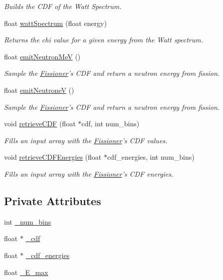 \begin{DoxyCompactItemize}
\begin{DoxyCompactList}\small\item\em Builds the C\-D\-F of the Watt Spectrum. \end{DoxyCompactList}\item 
float \hyperlink{classFissioner_a0d7eec9e2367c433a3dff894b86066af}{watt\-Spectrum} (float energy)
\begin{DoxyCompactList}\small\item\em Returns the chi value for a given energy from the Watt spectrum. \end{DoxyCompactList}\item 
float \hyperlink{classFissioner_a7d4ead1d590eecfc19e7a57361f1c4d7}{emit\-Neutron\-Me\-V} ()
\begin{DoxyCompactList}\small\item\em Sample the \hyperlink{classFissioner}{Fissioner}'s C\-D\-F and return a neutron energy from fission. \end{DoxyCompactList}\item 
float \hyperlink{classFissioner_ab60b9ea50cf7d8b1b1a2b7e5a134ee55}{emit\-Neutrone\-V} ()
\begin{DoxyCompactList}\small\item\em Sample the \hyperlink{classFissioner}{Fissioner}'s C\-D\-F and return a neutron energy from fission. \end{DoxyCompactList}\item 
void \hyperlink{classFissioner_a6df11ab0fc579364199a88e72d60f666}{retrieve\-C\-D\-F} (float $\ast$cdf, int num\-\_\-bins)
\begin{DoxyCompactList}\small\item\em Fills an input array with the \hyperlink{classFissioner}{Fissioner}'s C\-D\-F values. \end{DoxyCompactList}\item 
void \hyperlink{classFissioner_a62bbe8c05eea905ec6aef328bbab8da8}{retrieve\-C\-D\-F\-Energies} (float $\ast$cdf\-\_\-energies, int num\-\_\-bins)
\begin{DoxyCompactList}\small\item\em Fills an input array with the \hyperlink{classFissioner}{Fissioner}'s C\-D\-F energies. \end{DoxyCompactList}\end{DoxyCompactItemize}
\subsection*{Private Attributes}
\begin{DoxyCompactItemize}
\item 
int \hyperlink{classFissioner_a541a4b34ec2fc989a376df0cc5f6e905}{\-\_\-num\-\_\-bins}
\item 
float $\ast$ \hyperlink{classFissioner_a2669929b5d6d4dea800ffde9d6b11ff3}{\-\_\-cdf}
\item 
float $\ast$ \hyperlink{classFissioner_aadb16d9d947ed4d0527487dc0d43111c}{\-\_\-cdf\-\_\-energies}
\item 
float \hyperlink{classFissioner_a5eac55547fe61b5e559628aefe569298}{\-\_\-\-E\-\_\-max}
\end{DoxyCompactItemize}


